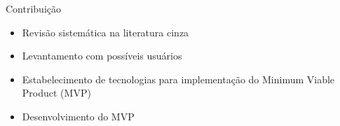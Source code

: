 \begin{frame}{{\sffamily Contribuição}}
  \begin{block}{}
    \begin{itemize}
      \item Revisão sistemática na literatura cinza
      \item Levantamento com possíveis usuários
      \item Estabelecimento de tecnologias para
            implementação do Minimum Viable Product (MVP)
      \item Desenvolvimento do MVP
    \end{itemize}
  \end{block}
\end{frame}